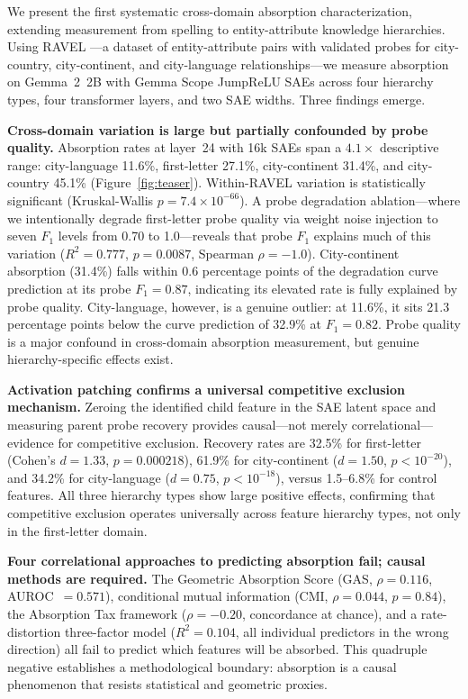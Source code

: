 \documentclass{article}
\begin{document}
We present the first systematic cross-domain absorption characterization, extending measurement from spelling to entity-attribute knowledge hierarchies. Using RAVEL \citep{huang2024ravel}---a dataset of entity-attribute pairs with validated probes for city-country, city-continent, and city-language relationships---we measure absorption on Gemma~2~2B with Gemma Scope JumpReLU SAEs across four hierarchy types, four transformer layers, and two SAE widths. Three findings emerge.

\textbf{Cross-domain variation is large but partially confounded by probe quality.} Absorption rates at layer~24 with 16k SAEs span a $4.1\times$ descriptive range: city-language 11.6\%, first-letter 27.1\%, city-continent 31.4\%, and city-country 45.1\% (Figure~\ref{fig:teaser}). Within-RAVEL variation is statistically significant (Kruskal-Wallis $p = 7.4 \times 10^{-66}$). A probe degradation ablation---where we intentionally degrade first-letter probe quality via weight noise injection to seven $F_1$ levels from 0.70 to 1.0---reveals that probe $F_1$ explains much of this variation ($R^2 = 0.777$, $p = 0.0087$, Spearman $\rho = -1.0$). City-continent absorption (31.4\%) falls within 0.6 percentage points of the degradation curve prediction at its probe $F_1 = 0.87$, indicating its elevated rate is fully explained by probe quality. City-language, however, is a genuine outlier: at 11.6\%, it sits 21.3 percentage points below the curve prediction of 32.9\% at $F_1 = 0.82$. Probe quality is a major confound in cross-domain absorption measurement, but genuine hierarchy-specific effects exist.

\textbf{Activation patching confirms a universal competitive exclusion mechanism.} Zeroing the identified child feature in the SAE latent space and measuring parent probe recovery provides causal---not merely correlational---evidence for competitive exclusion. Recovery rates are 32.5\% for first-letter (Cohen's $d = 1.33$, $p = 0.000218$), 61.9\% for city-continent ($d = 1.50$, $p < 10^{-20}$), and 34.2\% for city-language ($d = 0.75$, $p < 10^{-18}$), versus 1.5--6.8\% for control features. All three hierarchy types show large positive effects, confirming that competitive exclusion operates universally across feature hierarchy types, not only in the first-letter domain.

\textbf{Four correlational approaches to predicting absorption fail; causal methods are required.} The Geometric Absorption Score (GAS, $\rho = 0.116$, AUROC~$= 0.571$), conditional mutual information (CMI, $\rho = 0.044$, $p = 0.84$), the Absorption Tax framework ($\rho = -0.20$, concordance at chance), and a rate-distortion three-factor model ($R^2 = 0.104$, all individual predictors in the wrong direction) all fail to predict which features will be absorbed. This quadruple negative establishes a methodological boundary: absorption is a causal phenomenon that resists statistical and geometric proxies.
\end{document}
